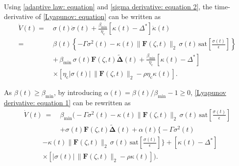 \documentclass{IEEEtaes}
\begin{document}
\noindent Using \eqref{adaptive law: equation} and \eqref{sigma derivative: equation 2}, the time-derivative of \eqref{Lyapunov: equation} can be written as
\begin{align}
\label{Lyapunov derivative: equation 1}
   \dot{V}(t)=~&\sigma(t) \dot{\sigma}(t) + \frac{\beta_{\text{min}}}{\eta_{\text{c}}} \left[\kappa(t) {-} \Delta^{*}\right] \dot{\kappa}(t)\nonumber\\
   =~&\beta(t)\left\{-\Gamma\sigma^2(t)-\kappa(t)\lVert \boldsymbol{F}(\zeta,t) \rVert_2 \,\sigma(t) \,\text{sat} \left[\frac{\sigma(t)}{\epsilon} \right]\right\}\nonumber\\
   &{+}\,\beta_{\text{min}}\,\sigma(t)\boldsymbol{F}(\zeta,t)\tilde{\boldsymbol{\Delta}}(t)+\frac{\beta_{\text{min}}}{\eta_{\text{c}}} \left[\kappa(t) {-} \Delta^{*}\right]\nonumber\\
   &{\times}\left[\eta_{\text{c}} \lvert \sigma(t) \rvert\, \lVert \boldsymbol{F}(\zeta,t) \rVert_2 {-} \rho \eta_{\text{c}} \kappa(t)\right].
\end{align} 

As $\beta(t)\geq\beta_{\text{min}}$, by introducing $\alpha(t)=\beta(t)/\beta_{\text{min}}-1\geq 0$, \eqref{Lyapunov derivative: equation 1} can be rewritten as
\begin{align}
\label{Lyap_deriv_2}
    \dot{V}(t)~{=}~&\beta_{\text{min}}\biggl({-}\Gamma\sigma^2(t){-}\kappa(t)\lVert \boldsymbol{F}(\zeta,t) \rVert_2\, \sigma(t) \,\text{sat} \left[\frac{\sigma(t)}{\epsilon} \right]\nonumber\\
    &{+}\sigma(t)\boldsymbol{F}(\zeta,t)
    \tilde{\boldsymbol{\Delta}}(t){+}\alpha(t)\biggl\{{-}\Gamma\sigma^2(t)\nonumber    
    \end{align}
    \begin{align}
    &{-}\kappa(t)\lVert \boldsymbol{F}(\zeta,t) \rVert_2\, \sigma(t)\,\text{sat} \left[\frac{\sigma(t)}{\epsilon} \right]\biggr\}{+}\left[\kappa(t) {-} \Delta^{*}\right]\nonumber\\
    &{\times}\left[ \lvert \sigma(t) \rvert \,\lVert \boldsymbol{F}(\zeta,t) \rVert_2 {-} \rho \kappa(t)\right]\biggr).
\end{align}
\end{document}
